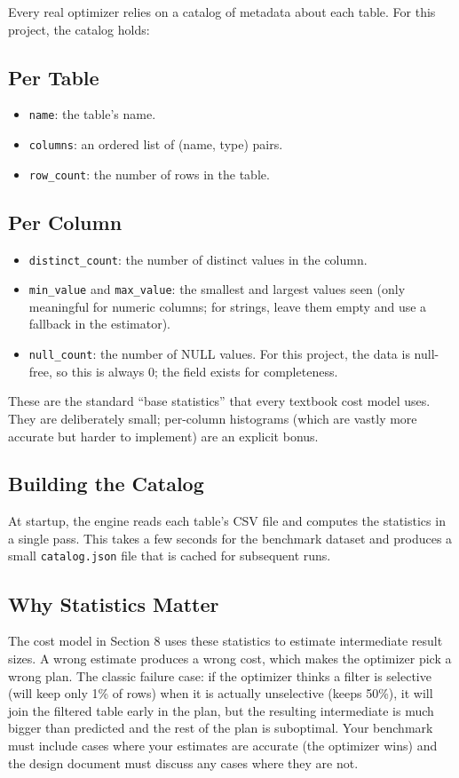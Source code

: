 \documentclass[11pt,a4paper]{article}
\begin{document}
Every real optimizer relies on a catalog of metadata about each table. For this project, the catalog holds:

\subsection{Per Table}
\begin{itemize}
\item \texttt{name}: the table's name.
\item \texttt{columns}: an ordered list of (name, type) pairs.
\item \texttt{row\_count}: the number of rows in the table.
\end{itemize}

\subsection{Per Column}
\begin{itemize}
\item \texttt{distinct\_count}: the number of distinct values in the column.
\item \texttt{min\_value} and \texttt{max\_value}: the smallest and largest values seen (only meaningful for numeric columns; for strings, leave them empty and use a fallback in the estimator).
\item \texttt{null\_count}: the number of NULL values. For this project, the data is null-free, so this is always 0; the field exists for completeness.
\end{itemize}

These are the standard ``base statistics'' that every textbook cost model uses. They are deliberately small; per-column histograms (which are vastly more accurate but harder to implement) are an explicit bonus.

\subsection{Building the Catalog}
At startup, the engine reads each table's CSV file and computes the statistics in a single pass. This takes a few seconds for the benchmark dataset and produces a small \texttt{catalog.json} file that is cached for subsequent runs.

\subsection{Why Statistics Matter}
The cost model in Section 8 uses these statistics to estimate intermediate result sizes. A wrong estimate produces a wrong cost, which makes the optimizer pick a wrong plan. The classic failure case: if the optimizer thinks a filter is selective (will keep only 1\% of rows) when it is actually unselective (keeps 50\%), it will join the filtered table early in the plan, but the resulting intermediate is much bigger than predicted and the rest of the plan is suboptimal. Your benchmark must include cases where your estimates are accurate (the optimizer wins) and the design document must discuss any cases where they are not.
\end{document}

